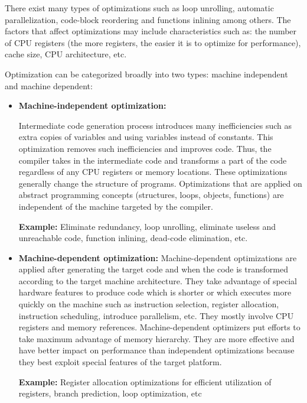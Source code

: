 There exist many types of optimizations such as loop unrolling, automatic parallelization, code-block reordering and functions inlining among others. The factors that affect optimizations may include characteristics such as: the number of CPU registers (the more registers, the easier it is to optimize for performance), cache size, CPU architecture, etc.

Optimization can be categorized broadly into two types: machine independent and machine dependent: 
\begin{itemize}
	
	\item \textbf{Machine-independent optimization:}
	
	Intermediate code generation process introduces many inefficiencies such as extra copies of variables and using variables instead of
	constants.
	This optimization removes such inefficiencies and improves code. Thus, the compiler takes in the intermediate code and transforms a part of the code regardless of any CPU registers or memory locations. These optimizations generally change the structure of programs.
	Optimizations that are applied on abstract programming concepts (structures, loops, objects, functions) are independent of the machine targeted by the compiler.
	
	\textbf{Example:} Eliminate redundancy, loop unrolling, eliminate useless and unreachable code, function inlining, dead-code elimination, etc.
	
	\item \textbf{Machine-dependent optimization:} 
	Machine-dependent optimizations are applied after generating the target code and when the code is transformed according to the target machine architecture. They take advantage of special hardware features to produce code which is shorter or which executes more quickly on the machine such as instruction selection, register allocation, instruction scheduling, introduce parallelism, etc.
	They mostly involve CPU registers and memory references. Machine-dependent optimizers put efforts to take maximum advantage of memory hierarchy. They are more effective and have better impact on performance than independent optimizations because they best exploit special features of the target platform.
	
	\textbf{Example:} Register allocation optimizations for efficient utilization of registers, branch prediction, loop optimization, etc
 
 
\end{itemize}
 

